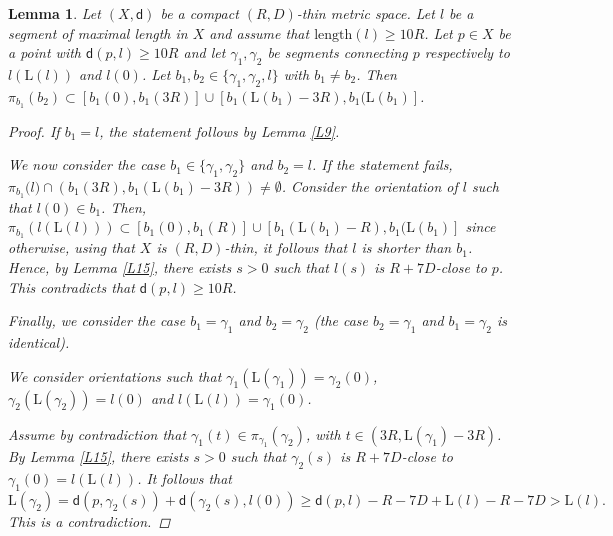 \documentclass[10pt]{article}
\newtheorem{lemma}[thm]{Lemma}
\theoremstyle{definition}
\newcommand{\length}{\mathrm{L}}
\newcommand{\sd}{\mathsf{d}}
\begin{document}
\begin{lemma} \label{L16}
Let $(X,\sd)$ be a compact $(R,D)$-thin metric space.
     Let $l$ be a segment of maximal length in $X$ and assume that $\mathrm{length}(l) \geq 10R$. Let $p \in X$ be a point with $\sd(p,l) \geq 10R$ and let $\gamma_1,\gamma_2$ be segments connecting $p$ respectively to $l(\length(l))$ and $l(0)$.
    Let $b_1,b_2 \in \{\gamma_1,\gamma_2,l\}$ with $b_1 \neq b_2$. Then $\pi_{b_1}(b_2) \subset [b_1(0),b_1(3R)] \cup [b_1(\length(b_1)-3R),b_1(\length(b_1)]$.
    \begin{proof}
        If $b_1=l$, the statement follows by Lemma \ref{L9}.
        
        We now consider the case $b_1 \in \{\gamma_1,\gamma_2\}$ and $b_2=l$. If the statement fails, $\pi_{b_1}\big(l\big) \cap (b_1(3R),b_1(\length(b_1)-3R)) \neq \emptyset$. Consider the orientation of $l$ such that $l(0) \in b_1$. Then, $\pi_{b_1}(l(\length(l))) \subset [b_1(0),b_1(R)] \cup [b_1(\length(b_1)-R),b_1(\length(b_1)]$ since otherwise, using that $X$ is $(R,D)$-thin, it follows that $l$ is shorter than $b_1$.
        Hence, by Lemma \ref{L15}, there exists $s>0$ such that $l(s)$ is $R+7D$-close to $p$. This contradicts that $\sd(p,l) \geq 10R$.
        
        Finally, we consider the case $b_1=\gamma_1$ and $b_2=\gamma_2$ (the case $b_2=\gamma_1$ and $b_1=\gamma_2$ is identical). 
        
        We consider orientations such that $\gamma_1(\length(\gamma_1))=\gamma_2(0)$, $\gamma_2(\length(\gamma_2))=l(0)$ and $l(\length(l))=\gamma_1(0)$.
        
        Assume by contradiction that $\gamma_1(t) \in \pi_{\gamma_1}(\gamma_2)$, with $t \in (3R,\length(\gamma_1)-3R)$. By Lemma \ref{L15}, there exists $s>0$ such that $\gamma_2(s)$ is $R+7D$-close to $\gamma_1(0)=l(\length(l))$. It follows that
        \[
        \length(\gamma_2)
        =\sd(p,
        \gamma_2(s))
        +\sd(\gamma_2(s),l(0)) \geq \sd(p,l)-R-7D + \length(l)-R-7D >\length(l).
        \]
        This is a contradiction.
    \end{proof}
    \end{lemma}
\end{document}
